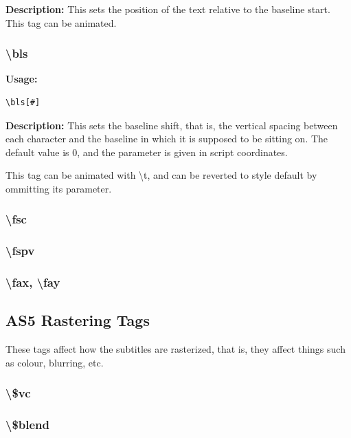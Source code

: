 \documentclass{spec}
\begin{document}
\textbf{Description:}
This sets the position of the text relative to the baseline start. This tag can be animated.


\subsubsection{\textbackslash bls}
\textbf{Usage:}
\begin{verbatim}
\bls[#]
\end{verbatim}

\textbf{Description:}
This sets the baseline shift, that is, the vertical spacing between each character and the baseline
in which it is supposed to be sitting on. The default value is 0, and the parameter is given in
script coordinates.

This tag can be animated with \textbackslash t, and can be reverted to style default by ommitting
its parameter.

\subsubsection{\textbackslash fsc}

\subsubsection{\textbackslash fspv}

\subsubsection{\textbackslash fax, \textbackslash fay}


\subsection{AS5 Rastering Tags}
These tags affect how the subtitles are rasterized, that is, they affect things such as
colour, blurring, etc.

\subsubsection{\textbackslash\$vc}

\subsubsection{\textbackslash{\$blend}}
\end{document}
